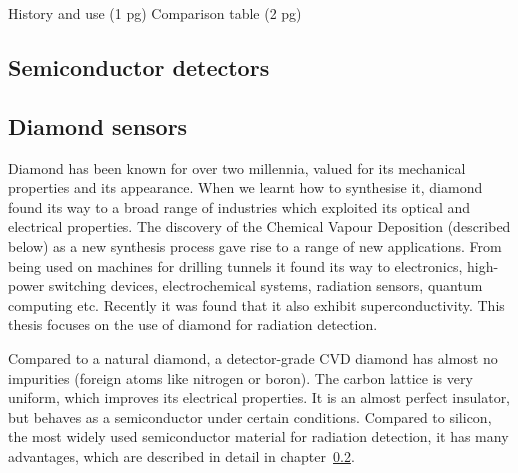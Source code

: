 \documentclass[twoside,12pt]{packages/mytustyle}  %
\begin{document}
History and use (1 pg)
Comparison table (2 pg)


\subsection{Semiconductor detectors}

\subsection{Diamond sensors}
Diamond has been known for over two millennia, valued for its mechanical properties and its appearance. When we learnt how to synthesise it, diamond found its way to a broad range of industries which exploited its optical and electrical properties. The discovery of the Chemical Vapour Deposition (described below) as a new synthesis process gave rise to a range of new applications. From being used on machines for drilling tunnels it found its way to electronics, high-power switching devices, electrochemical systems, radiation sensors, quantum computing etc. Recently it was found that it also exhibit superconductivity. This thesis focuses on the use of diamond for radiation detection.

Compared to a natural diamond, a detector-grade CVD diamond has almost no impurities (foreign atoms like nitrogen or boron). The carbon lattice is very uniform, which improves its electrical properties. It is an almost perfect insulator, but behaves as a semiconductor under certain conditions. Compared to silicon, the most widely used semiconductor material for radiation detection, it has many advantages, which are described in detail in chapter~\ref{}.


\end{document}

